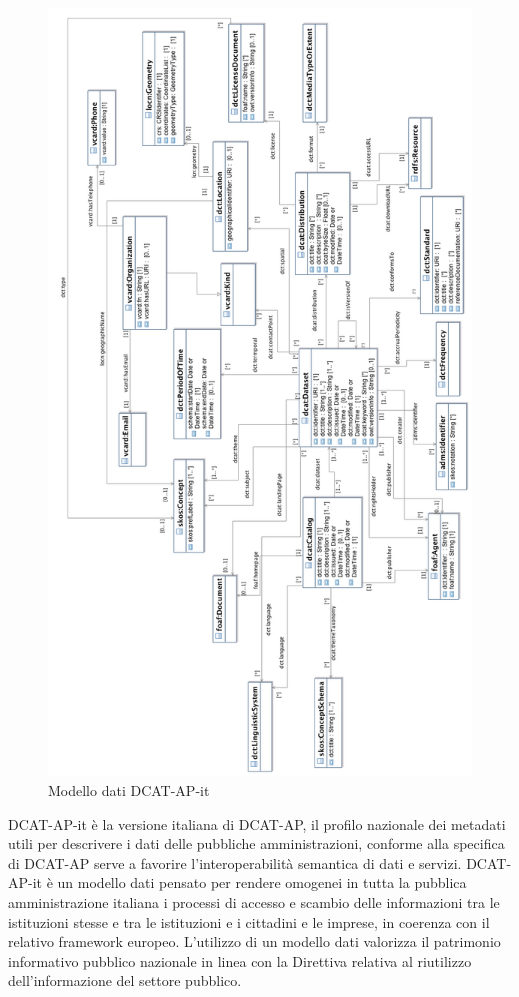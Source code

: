 \documentclass{article}
\theoremstyle{plain}
\theoremstyle{definition}
\begin{document}
\begin{figure}[htbp]
\begin{center}
\includegraphics[scale=0.45]{img/DCAT-AP_IT_UML.png}
\caption{Modello dati DCAT-AP-it}
\end{center}
\end{figure}

DCAT-AP-it è la versione italiana di DCAT-AP, il profilo nazionale dei metadati utili per descrivere i dati delle pubbliche amministrazioni, conforme alla specifica di DCAT-AP serve a favorire l'interoperabilità semantica di dati e servizi. DCAT-AP-it è un modello dati pensato per rendere omogenei in tutta la pubblica amministrazione italiana i processi di accesso e scambio delle informazioni tra le istituzioni stesse e tra le istituzioni e i cittadini e le imprese, in coerenza con il relativo framework europeo. L'utilizzo di un modello dati valorizza il patrimonio informativo pubblico nazionale in linea con la Direttiva relativa al riutilizzo dell'informazione del settore pubblico.
\end{document}
